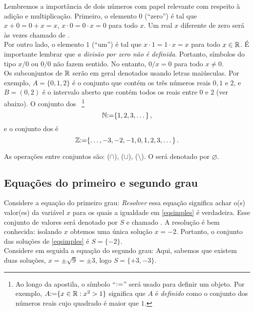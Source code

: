 Lembremos a importância de dois números com papel relevante com respeito à 
adição e multiplicação. Primeiro, o elemento $0$ (``zero'') é tal que $x+0=0+x=x$,
$x\cdot 0=0\cdot x=0$ para todo $x$. 
Um real $x$ diferente de zero será às vezes chamado de .\\

Por outro lado, o elemento $1$ (``um'') é tal que $x\cdot 1=1\cdot x=x$ 
para todo $x\in \mathbb{R}$.
É importante lembrar que \emph{a divisão por zero não é definida}.
Portanto, 
símbolos do tipo $x/0$ ou $0/0$ não fazem sentido. No entanto, $0/x=0$ para todo
$x\neq 0$.\\

Os subconjuntos de $\mathbb{R}$ serão em geral denotados usando letras maiúsculas.
Por exemplo, $A=\{0,1,2\}$ é o conjunto que contém os três números reais $0,1$ 
e $2$, e $B=(0,2)$ é o intervalo aberto que contém todos os reais entre $0$ e
$2$ (ver abaixo).
O conjunto dos ~\footnote{Ao longo da apostila,
o símbolo ``${:=}$'' será usado para definir um objeto. Por exemplo,
$A{:=}\{x\in \mathbb{R}: x^2>1\}$ significa que $A$ é \emph{definido} como o conjunto
dos números reais cujo quadrado é maior que $1$.}
$$\mathbb{N}{:=} \{1,2,3,\dots\}\,,$$
e o conjunto dos  é
$$\mathbb{Z}{:=} \{\dots,-3,-2,-1,0,1,2,3,\dots\}\,.$$


As operações entre conjuntos são:  ($\cap$),  
($\cup$),  ($\setminus$). 
O  será denotado por $\varnothing$.

\subsection{Equações do primeiro e segundo grau}\label{SecEquacoes}
Considere a equação do primeiro grau: 
\emph{Resolver} essa equação
significa achar o(s) valor(es) da variável $x$ para os quais a igualdade em \eqref{eqsimples} 
é verdadeira. Esse conjunto de valores será denotado por $S$ e chamado . 
A resolução é bem conhecida:
isolando $x$ obtemos 
uma única solução $x=-2$. Portanto, o conjunto das soluções de \eqref{eqsimples} é $S=\{-2\}$.\\


Considere em seguida a equação do segundo grau:
Aqui, sabemos que existem duas soluções, $x=\pm \sqrt{9}=\pm 3$, logo $S=\{+3,-3\}$. \\

